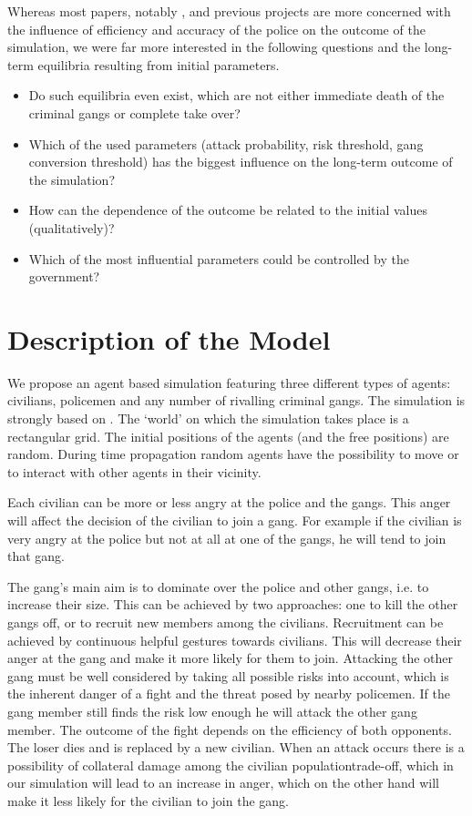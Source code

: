 \documentclass[11pt]{article}
\begin{document}
Whereas most papers, notably \cite{bennett}, and previous projects \cite{kouzoupis} are more concerned with the influence of efficiency and accuracy of the police on the outcome of the simulation, we were far more interested in the following questions and the long-term equilibria resulting from initial parameters. 
\begin{itemize}
\item Do such equilibria even exist, which are not either immediate death of the criminal gangs or complete take over? 
\item Which of the used parameters (attack probability, risk threshold, gang conversion threshold) has the biggest influence on the long-term outcome of the simulation?
\item How can the dependence of the outcome be related to the initial values (qualitatively)?
\item Which of the most influential parameters could be controlled by the government?
\end{itemize}

\section{Description of the Model}
We propose an agent based simulation featuring three different types of agents: civilians, policemen and any number of rivalling criminal gangs. The simulation is strongly based on \cite{epstein, bennett}. The `world' on which the simulation takes place is a rectangular grid. The initial positions of the agents (and the free positions) are random. During time propagation random agents have the possibility to move or to interact with other agents in their vicinity. 

Each civilian can be more or less angry at the police and the gangs. This anger will affect the decision of the civilian to join a gang. For example if the civilian is very angry at the police but not at all at one of the gangs, he will tend to join that gang. 

The gang's main aim is to dominate over the police and other gangs, i.e. to increase their size. This can be achieved by two approaches: one to kill the other gangs off, or to recruit new members among the civilians. Recruitment can be achieved by continuous helpful gestures towards civilians. This will decrease their anger at the gang and make it more likely for them to join. Attacking the other gang must be well considered by taking all possible risks into account, which is the inherent danger of a fight and the threat posed by nearby policemen. If the gang member still finds the risk low enough he will attack the other gang member. The outcome of the fight depends on the efficiency of both opponents. The loser  dies and is replaced by a new civilian. When an attack occurs there is a possibility of collateral damage among the civilian populationtrade-off, which in our simulation will lead to an increase in anger, which on the other hand will make it less likely for the civilian to join the gang.
\end{document}

